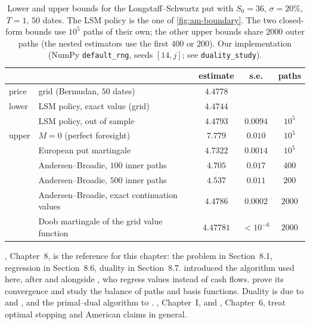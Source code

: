 \begin{table}[ht]
  \centering
  \small
  \begin{tabular}{@{}llccc@{}}
    \toprule
    & & estimate & s.e. & paths\\
    \midrule
    price & grid (Bermudan, $50$ dates) & $4.4778$ & & \\
    \midrule
    lower & LSM policy, exact value (grid) & $4.4744$ & & \\
     & LSM policy, out of sample & $4.4793$ & $0.0094$ & $10^5$\\
    \midrule
    upper & $M=0$ (perfect foresight) & $7.779$ & $0.010$ & $10^5$\\
     & European put martingale & $4.7322$ & $0.0014$ & $10^5$\\
     & Andersen--Broadie, $100$ inner paths & $4.705$ & $0.017$ & $400$\\
     & Andersen--Broadie, $500$ inner paths & $4.537$ & $0.011$ & $200$\\
     & Andersen--Broadie, exact continuation values & $4.4786$ & $0.0002$ & $2000$\\
     & Doob martingale of the grid value function & $4.47781$ & $<10^{-6}$ & $2000$\\
    \bottomrule
  \end{tabular}
  \caption{Lower and upper bounds for the Longstaff--Schwartz put with $S_0=36$,
    $\sigma=20\%$, $T=1$, $50$ dates. The LSM policy is the one of \cref{fig:am-boundary}.
    The two closed-form bounds use $10^5$ paths of their own; the other upper bounds share
    $2000$ outer paths (the nested estimators use the first $400$ or $200$). Our implementation (NumPy \texttt{default\_rng}, seeds $[14,j]$; see
    \texttt{duality\_study}).}
  \label{tab:am-bounds}
\end{table}



\furtherreading
\textcite{glasserman-mc}, Chapter~8, is the reference for this chapter: the problem in
Section~8.1, regression in Section~8.6, duality in Section~8.7. \textcite{longstaff-schwartz}
introduced the algorithm used here, after \textcite{carriere} and alongside
\textcite{tsitsiklis-vanroy}, who regress values instead of cash flows.
\textcite{clement-lamberton-protter} prove its convergence and \textcite{glasserman-yu}
study the balance of paths and basis functions. Duality is due to \textcite{rogers-duality}
and \textcite{haugh-kogan}, and the primal--dual algorithm to \textcite{andersen-broadie}.
\textcite{peskir-shiryaev}, Chapter~I, and \textcite{follmer-schied}, Chapter~6, treat
optimal stopping and American claims in general.
